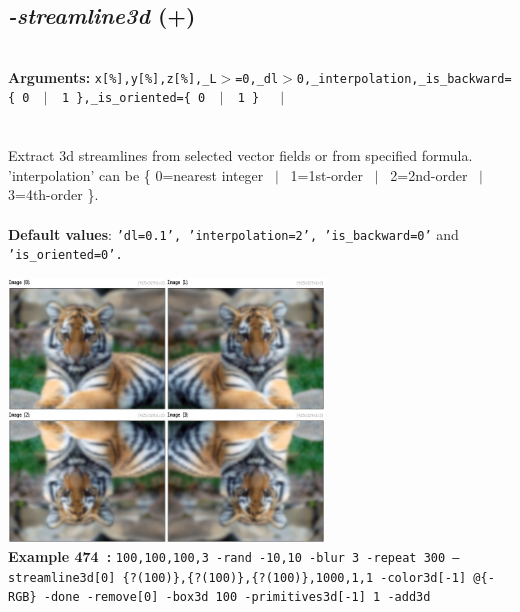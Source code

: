 \documentclass[a4paper,11pt,twoside]{book}
\begin{document}
\subsection{\emph{-streamline3d} (+)}\vspace*{-0.5em}
~\\\textbf{Arguments: } 
{\small \texttt{x[\%],y[\%],z[\%],\_L$>$=0,\_dl$>$0,\_interpolation,\_is\_backward=\{ 0 ~$|$~ 1 \},\_is\_oriented=\{ 0 ~$|$~ 1 \}}}~~~$|$\\
\\~\\
Extract 3d streamlines from selected vector fields or from specified formula.
~\\'interpolation' can be \{ 0=nearest integer ~$|$~ 1=1st-order ~$|$~ 2=2nd-order ~$|$~ 3=4th-order \}.
~\\~\\\textbf{Default values}: {\small \texttt{'dl=0.1', 'interpolation=2', 'is\_backward=0'} and \texttt{'is\_oriented=0'.}}
\begin{center}\includegraphics[keepaspectratio=true,height=7cm,width=\textwidth]{img/gmic_def474.jpg}\\
{\footnotesize \textbf{Example 474~:} \texttt{100,100,100,3 -rand -10,10 -blur 3 -repeat 300 --streamline3d[0] \{?(100)\},\{?(100)\},\{?(100)\},1000,1,1 -color3d[-1] @\{-RGB\} -done -remove[0] -box3d 100 -primitives3d[-1] 1 -add3d}}
\end{center}
\end{document}
